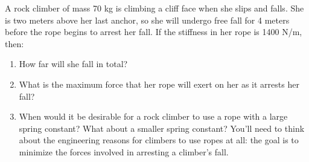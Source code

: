 \documentclass[12pt]{article}
\begin{document}
\Large
\centerline{}
\normalsize
\centerline{}



{A rock climber of mass 70 kg is climbing a cliff face when she slips and falls. She is two meters above her last anchor, so she will undergo free fall for 4 meters before the rope begins to arrest her fall. If the stiffness in her rope is 1400 N/m, then:}
\begin{enumerate}
	\item{How far will she fall in total?}
	\vspace{2in}
	
	\item{What is the maximum force that her rope will exert on her as it arrests her fall?}
	\vspace{1.5in}
	
	\item When would it be desirable for a rock climber to use a rope with a large spring constant? What about a smaller spring constant? You'll need to think about 
	the engineering reasons for climbers to use ropes at all: the goal is to minimize the forces involved in arresting a climber's fall.
\end{enumerate}

\newpage
%
%
%

%
%


%
%
%
%
\end{document}
